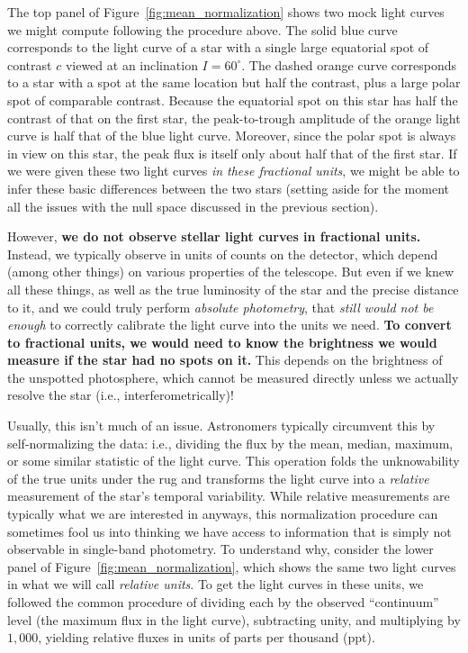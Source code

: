 \documentclass[modern,linenumbers]{aastex62}
\begin{document}
The top panel of Figure~\ref{fig:mean_normalization} shows two mock
light curves we might compute following the procedure above. The solid blue
curve corresponds to the light curve of a star with a single large
equatorial spot of contrast $c$ viewed at an inclination $I = 60^\circ$.
The dashed orange curve corresponds to a star with a spot at the same
location but half the contrast, plus a large polar spot of comparable
contrast. Because the equatorial spot on this star has half the contrast of that on
the first star, the peak-to-trough amplitude of the orange light curve is half that of
the blue light curve. Moreover, since the polar spot is always in view on
this star, the peak flux is itself only about half that of the first star.
If we were given these two light curves \emph{in these fractional units},
we might be able to infer these basic differences between the two stars
(setting aside for the moment all the issues with the null space discussed
in the previous section).

However, \textbf{we do not observe stellar light curves in fractional units.}
Instead, we typically observe in units of counts on
the detector, which depend (among other things) on various properties of the telescope.
But even if we knew all these things, as well as the true luminosity
of the star and the precise distance to it, and we could truly
perform \emph{absolute photometry}, that \emph{still would not be enough}
to correctly calibrate the light curve into the units we need.
\textbf{To convert to fractional units, we would need to know the brightness we would
    measure if the star had no spots on it.} This depends on the brightness
of the unspotted photosphere, which cannot be measured directly unless
we actually resolve the star (i.e., interferometrically)!

Usually, this isn't much of an issue. Astronomers typically circumvent
this by self-normalizing the data: i.e., dividing the flux by the mean,
median, maximum, or some similar statistic of the light curve.
%
This operation folds the unknowability of
the true units under the rug and transforms the light curve into a \emph{relative}
measurement of the star's temporal variability. While relative measurements
are typically what we are interested in anyways, this normalization procedure
can sometimes fool us into thinking we have access to information that
is simply not observable in single-band photometry. To understand why,
consider the lower panel of Figure~\ref{fig:mean_normalization}, which shows the
same two light curves in what we will call \emph{relative units}. To
get the light curves in these units, we followed the common procedure of
dividing each by the observed ``continuum'' level (the maximum flux in the
light curve), subtracting unity, and multiplying by $1{,}000$, yielding
relative fluxes in units of parts per thousand (ppt).
\end{document}
